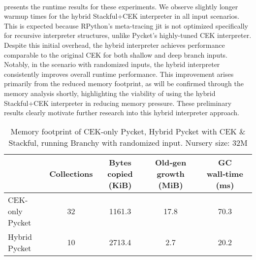 
      \paragraph{}%
         presents the runtime results for these experiments. We observe slightly longer warmup times for the hybrid Stackful+CEK interpreter in all input scenarios. This is expected because RPython's meta-tracing \gls{jit} is not optimized specifically for recursive interpreter structures, unlike Pycket's highly-tuned CEK interpreter. Despite this initial overhead, the hybrid interpreter achieves performance comparable to the original CEK for both shallow and deep branch inputs. Notably, in the scenario with randomized inputs, the hybrid interpreter consistently improves overall runtime performance. This improvement arises primarily from the reduced memory footprint, as will be confirmed through the memory analysis shortly, highlighting the viability of using the hybrid Stackful+CEK interpreter in reducing memory pressure. These preliminary results clearly motivate further research into this hybrid interpreter approach.

      \begin{table}[!h]
        \centering
        \small
        \begin{tabular}{lcccc}
          \toprule
          & Collections & Bytes copied (KiB) & Old‑gen growth (MiB) & GC wall‑time (ms)\\
          \midrule
          CEK-only Pycket        	& 32   & 1161.3 & 17.8  & 70.3\\
          Hybrid Pycket 				  & 10  &  2713.4 & 2.7 & 20.2\\
          \bottomrule
        \end{tabular}
        \caption{Memory footprint of CEK-only Pycket, Hybrid Pycket with CEK \& Stackful, running Branchy with randomized input. Nursery size: 32M}
        \label{table:memory-footprints-cek-vs-hybrid}
		  \end{table}

